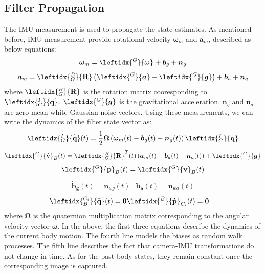 \documentclass[a4paper, 10pt, conference]{ieeeconf}      %
\begin{document}
\subsection{Filter Propagation}

The IMU measurement is used to propagate the state estimates. As mentioned before, IMU measurement provide rotational velocity $ \bm {\omega}_m $ and $ \bm a_m $, described as below equations: 
\begin{equation}
\bm{\omega}_m ={\leftidx{^G}{ {\bm \omega}}_{}} + \bm b_g + \bm n_g
\end{equation}
\begin{equation}
\bm{a}_m =   \leftidx{_G^B}{{\textbf R}}  \left( \leftidx{^G}{\bm a} - \leftidx{^G}{\bm g}\right) + \bm b_a +\bm n_a
\end{equation}
where $ \leftidx{_G^B}{{\textbf R}} $ is the rotation matrix cooresponding to $  \leftidx{_G^I}{{\textbf q}} $. $\leftidx{^G}{\bm g}  $ is the gravitational acceleration.  $ \bm n_g $ and $ \bm n_a $  are zero-mean white Gaussian noise vectors. Using these measurements, we can
write the dynamics of the filter state vector as:
\begin{equation}
\leftidx{_G^I}{\dot {\bar{\textbf q}}}(t)=\frac{1}{2} \bm \Omega\left(  {\bm \omega}_m (t)-\bm b_g(t) - \bm n_g(t) \right)\leftidx{_G^I}{ {\bar{\textbf q}}} 
\end{equation}
\begin{equation}
{\leftidx{^G}{\dot {\textbf v}}_{B}}(t)=\leftidx{_G^B}{{\textbf R}}^T(t)\left( \bm a_m(t)-\bm b_a(t)-\bm n_a(t) \right)+  \leftidx{^G}{\bm g}
\end{equation}
\begin{equation}
{\leftidx{^G}{\dot {\textbf p}}_{B}}(t)= {\leftidx{^G}{ {\textbf v}}_{B}}(t)
\end{equation}
\begin{eqnarray}
{ \bm {\dot b_g}}(t) =  \bm n_{wg}(t) & { \bm {\dot b_a}}(t) =  \bm n_{wa}(t)
\end{eqnarray}
\begin{eqnarray}
\leftidx{_B^{C_i}}{\dot {\bar{\textbf q}}}(t) = \bm 0 & \leftidx{^B}{\dot {{\textbf p}}}_{C_i}(t)= \bm 0
\end{eqnarray}
where $ \bm \Omega $ is the quaternion multiplication matrix corresponding to the angular velocity vector $ \bm \omega $. In the above, the first three equations describe the dynamics of the current body motion. The fourth line models the biases  as random walk processes. The fifth line describes the fact that camera-IMU transformations do not change in time. As for the past body states, they remain constant once the corresponding image is captured.
\end{document}
